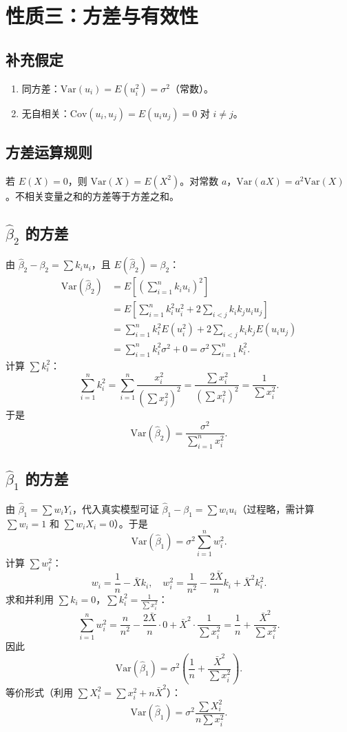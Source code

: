 \documentclass[12pt]{article}
\begin{document}
\section{性质三：方差与有效性}
\subsection{补充假定}
\begin{enumerate}
    \item[3.] 同方差：$\mathrm{Var}(u_i) = E(u_i^2) = \sigma^2$（常数）。
    \item[4.] 无自相关：$\mathrm{Cov}(u_i, u_j) = E(u_i u_j) = 0$ 对 $i \neq j$。
\end{enumerate}

\subsection{方差运算规则}
若 $E(X)=0$，则 $\mathrm{Var}(X) = E(X^2)$。对常数 $a$，$\mathrm{Var}(aX) = a^2\mathrm{Var}(X)$。不相关变量之和的方差等于方差之和。

\subsection{$\hat{\beta}_2$ 的方差}
由 $\hat{\beta}_2 - \beta_2 = \sum k_i u_i$，且 $E(\hat{\beta}_2) = \beta_2$：
\begin{align*}
\mathrm{Var}(\hat{\beta}_2) &= E\left[ \left( \sum_{i=1}^n k_i u_i \right)^2 \right]\\
&= E\left[ \sum_{i=1}^n k_i^2 u_i^2 + 2 \sum_{i<j} k_i k_j u_i u_j \right]\\
&= \sum_{i=1}^n k_i^2 E(u_i^2) + 2 \sum_{i<j} k_i k_j E(u_i u_j)\\
&= \sum_{i=1}^n k_i^2 \sigma^2 + 0 = \sigma^2 \sum_{i=1}^n k_i^2.
\end{align*}
计算 $\sum k_i^2$：
\[
\sum_{i=1}^n k_i^2 = \sum_{i=1}^n \frac{x_i^2}{(\sum x_j^2)^2} = \frac{\sum x_i^2}{(\sum x_i^2)^2} = \frac{1}{\sum x_i^2}.
\]
于是
\[
\boxed{\mathrm{Var}(\hat{\beta}_2) = \frac{\sigma^2}{\sum_{i=1}^n x_i^2}}.
\]

\subsection{$\hat{\beta}_1$ 的方差}
由 $\hat{\beta}_1 = \sum w_i Y_i$，代入真实模型可证 $\hat{\beta}_1 - \beta_1 = \sum w_i u_i$（过程略，需计算 $\sum w_i = 1$ 和 $\sum w_i X_i = 0$）。于是
\[
\mathrm{Var}(\hat{\beta}_1) = \sigma^2 \sum_{i=1}^n w_i^2.
\]
计算 $\sum w_i^2$：
\[
w_i = \frac{1}{n} - \bar{X} k_i,\quad w_i^2 = \frac{1}{n^2} - \frac{2\bar{X}}{n} k_i + \bar{X}^2 k_i^2.
\]
求和并利用 $\sum k_i = 0$，$\sum k_i^2 = \frac{1}{\sum x_i^2}$：
\[
\sum_{i=1}^n w_i^2 = \frac{n}{n^2} - \frac{2\bar{X}}{n}\cdot 0 + \bar{X}^2 \cdot \frac{1}{\sum x_i^2} = \frac{1}{n} + \frac{\bar{X}^2}{\sum x_i^2}.
\]
因此
\[
\boxed{\mathrm{Var}(\hat{\beta}_1) = \sigma^2 \left( \frac{1}{n} + \frac{\bar{X}^2}{\sum x_i^2} \right)}.
\]
等价形式（利用 $\sum X_i^2 = \sum x_i^2 + n\bar{X}^2$）：
\[
\mathrm{Var}(\hat{\beta}_1) = \sigma^2 \frac{\sum X_i^2}{n \sum x_i^2}.
\]
\end{document}
